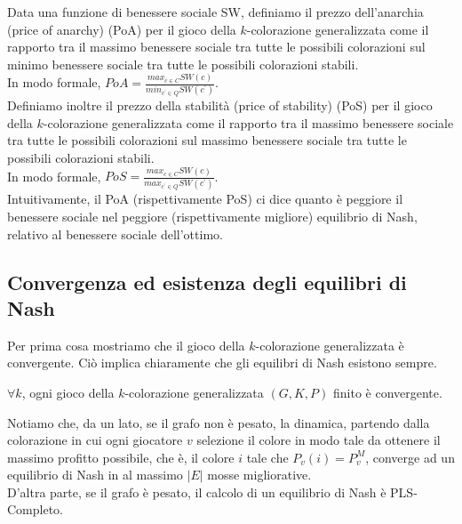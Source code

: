 Data una funzione di benessere sociale SW, definiamo il prezzo dell'anarchia (price of anarchy) (PoA) per il gioco della \(k\)-colorazione generalizzata come il rapporto tra il massimo benessere sociale tra tutte le possibili colorazioni sul minimo benessere sociale tra tutte le possibili colorazioni stabili.\\

In modo formale, \(PoA = \frac{max_{c \in C} SW(c)}{min_{c^{\prime} \in Q} SW(c^{\prime})}\).\\

Definiamo inoltre il prezzo della stabilità (price of stability) (PoS) per il gioco della \(k\)-colorazione generalizzata come il rapporto tra il massimo benessere sociale tra tutte le possibili colorazioni sul massimo benessere sociale tra tutte le possibili colorazioni stabili.\\
In modo formale, \(PoS = \frac{max_{c \in C} SW(c)}{max_{c^{\prime} \in Q} SW(c^{\prime})}\).\\

Intuitivamente, il PoA (rispettivamente PoS) ci dice quanto è peggiore il benessere sociale nel peggiore (rispettivamente migliore) equilibrio di Nash, relativo al benessere sociale dell'ottimo.\\

\subsection{Convergenza ed esistenza degli equilibri di Nash}
\justify
Per prima cosa mostriamo che il gioco della \(k\)-colorazione generalizzata è convergente. Ciò implica chiaramente che gli equilibri di Nash esistono sempre.\\

\begin{prop}
\label{proposition1}
	\(\forall k\), ogni gioco della \(k\)-colorazione generalizzata \((G, K, P)\) finito è convergente.
\end{prop}

Notiamo che, da un lato, se il grafo non è pesato, la dinamica, partendo dalla colorazione in cui ogni giocatore \(v\) selezione il colore in modo tale da ottenere il massimo profitto possibile, che è, il colore \(i\) tale che \(P_v (i) = P_v^M\), converge ad un equilibrio di Nash in al massimo \(|E|\) mosse migliorative.\\

D'altra parte, se il grafo è pesato, il calcolo di un equilibrio di Nash è PLS-Completo.\\

